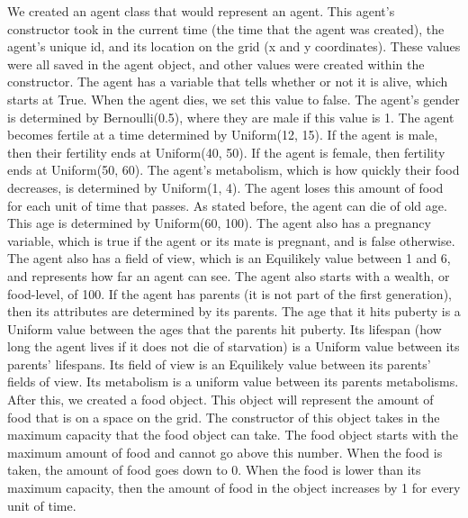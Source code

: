 \documentclass[11pt]{article}
\begin{document}
\begin{multicols}{2}
We created an agent class that would represent an agent. This agent's constructor took in the current time (the time that the agent was created), the agent's unique id, and its location on the grid (x and y coordinates). These values were all saved in the agent object, and other values were created within the constructor. The agent has a variable that tells whether or not it is alive, which starts at True. When the agent dies, we set this value to false. The agent's gender is determined by Bernoulli(0.5), where they are male if this value is 1. The agent becomes fertile at a time determined by Uniform(12, 15). If the agent is male, then their fertility ends at Uniform(40, 50). If the agent is female, then fertility ends at Uniform(50, 60). The agent's metabolism, which is how quickly their food decreases, is determined by Uniform(1, 4). The agent loses this amount of food for each unit of time that passes. As stated before, the agent can die of old age. This age is determined by Uniform(60, 100). The agent also has a pregnancy variable, which is true if the agent or its mate is pregnant, and is false otherwise. The agent also has a field of view, which is an Equilikely value between 1 and 6, and represents how far an agent can see.
The agent also starts with a wealth, or food-level, of 100.
\newline
If the agent has parents (it is not part of the first generation), then its attributes are determined by its parents. The age that it hits puberty is a Uniform value between the ages that the parents hit puberty. Its lifespan (how long the agent lives if it does not die of starvation) is a Uniform value between its parents' lifespans. Its field of view is an Equilikely value between its parents' fields of view. Its metabolism is a uniform value between its parents metabolisms.
\newline
\newline
After this, we created a food object. This object will represent the amount of food that is on a space on the grid. The constructor of this object takes in the maximum capacity that the food object can take. The food object starts with the maximum amount of food and cannot go above this number. When the food is taken, the amount of food goes down to 0. When the food is lower than its maximum capacity, then the amount of food in the object increases by 1 for every unit of time.
\newline
\newline

\end{multicols}
\end{document}
